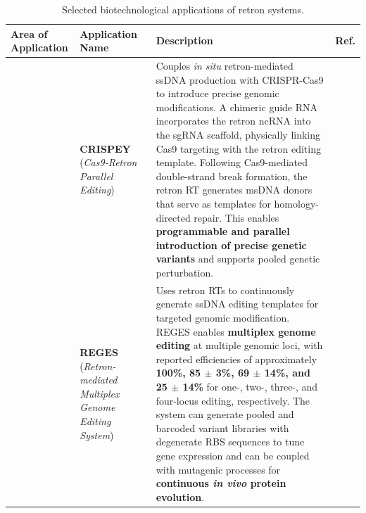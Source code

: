 \begin{table}[H]
\centering
\scriptsize
\setlength{\tabcolsep}{4pt}
\renewcommand{\arraystretch}{1.25}
\caption{Selected biotechnological applications of retron systems.}
\label{tab:retron_biotechnological_applications}
\begin{tabularx}{\textwidth}{
    >{\raggedright\arraybackslash}p{}
    >{\raggedright\arraybackslash}p{}
    X
    >{\centering\arraybackslash}p{}
}
\toprule
\textbf{Area of Application} &
\textbf{Application Name} &
\textbf{Description} &
\textbf{Ref.} \\
\midrule

\multirow{2}{*}{%
    \parbox{0.17\textwidth}{\raggedright\textbf{Precise Genome\\ Engineering}}
}
&
\textbf{CRISPEY}
(\textit{Cas9-Retron Parallel Editing})
&
Couples \textit{in situ} retron-mediated ssDNA production with CRISPR-Cas9 to introduce precise genomic modifications. A chimeric guide RNA incorporates the retron ncRNA into the sgRNA scaffold, physically linking Cas9 targeting with the retron editing template. Following Cas9-mediated double-strand break formation, the retron RT generates msDNA donors that serve as templates for homology-directed repair. This enables \textbf{programmable and parallel introduction of precise genetic variants} and supports pooled genetic perturbation.
&
\cite{farzadfard2021, sharon2018}
\\
\cline{2-4}
&
\textbf{REGES}
(\textit{Retron-mediated Multiplex Genome Editing System})
&
Uses retron RTs to continuously generate ssDNA editing templates for targeted genomic modification. REGES enables \textbf{multiplex genome editing} at multiple genomic loci, with reported efficiencies of approximately \textbf{100\%, 85 $\pm$ 3\%, 69 $\pm$ 14\%, and 25 $\pm$ 14\%} for one-, two-, three-, and four-locus editing, respectively. The system can generate pooled and barcoded variant libraries with degenerate RBS sequences to tune gene expression and can be coupled with mutagenic processes for \textbf{continuous \textit{in vivo} protein evolution}.
&
\cite{zhao2022reges}
\\
\midrule


\end{tabularx}
\end{table}

